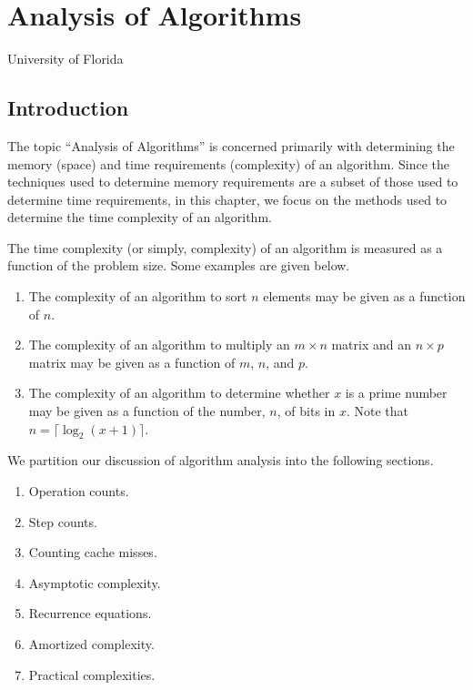 \chapter{
Analysis of Algorithms}

\begin{chapterauthors}
{University of Florida}
\end{chapterauthors}


\section{Introduction}\label{sec:intro}
The topic ``Analysis of Algorithms'' is concerned primarily with determining
the memory (space) and time requirements (complexity)
of an algorithm. Since the techniques
used to determine memory requirements are a subset of those used to
determine time requirements, in this chapter, we focus
on the methods used to determine the time complexity of an algorithm.

The time complexity (or simply, complexity)
of an algorithm
is measured
as a function of the problem size. Some examples
are given below.
\begin{enumerate}
\item
The complexity of an
algorithm to sort $n$ elements may be given as a function of $n$.
\item
The complexity of an
algorithm to multiply an $m \times n$ matrix and an $n \times p$ matrix
may be given as a function of $m$, $n$, and $p$.
\item
The complexity of an
algorithm to determine whether $x$ is a prime number may be given as a
function of the number, $n$, of bits
in $x$.
Note that
$n = \lceil \log_2 (x + 1)\rceil$.
\end{enumerate}

We partition our discussion of algorithm analysis into the following sections.
\begin{enumerate}
\item
Operation counts.
\item
Step counts.
\item
Counting cache misses.
\item
Asymptotic complexity.
\item
Recurrence equations.
\item
Amortized complexity.
\item
Practical complexities.
\end{enumerate}

